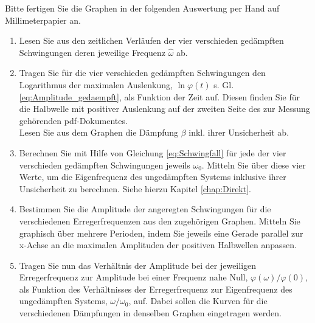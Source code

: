 \begin{hint}
	Bitte fertigen Sie die Graphen in der folgenden Auswertung per Hand auf Millimeterpapier an.
\end{hint}

\begin{enumerate}
	\item \label{aw:Schwingfall} Lesen Sie aus den zeitlichen Verläufen der vier verschieden gedämpften Schwingungen deren jeweilige Frequenz $\hat{\omega}$ ab.
	\item \label{aw:Log_Dekrement}Tragen Sie für die vier verschieden gedämpften Schwingungen den Logarithmus der maximalen Auslenkung, $\ln\varphi(t)$ s. Gl. \ref{eq:Amplitude_gedaempft}, als Funktion der Zeit auf. Diesen finden Sie für die Halbwelle mit positiver Auslenkung auf der zweiten Seite des zur Messung gehörenden pdf-Dokumentes. \\
	Lesen Sie aus dem Graphen die Dämpfung $\beta$ inkl. ihrer Unsicherheit ab.
	\item Berechnen Sie mit Hilfe von Gleichung \ref{eq:Schwingfall} für jede der vier verschieden gedämpften Schwingungen jeweils $\omega_0$. Mitteln Sie über diese vier Werte, um die Eigenfrequenz des ungedämpften Systems inklusive ihrer Unsicherheit zu berechnen. Siehe hierzu Kapitel \ref{chap:Direkt}.
	\item Bestimmen Sie die Amplitude der angeregten Schwingungen für die verschiedenen Erregerfrequenzen aus den zugehörigen Graphen. Mitteln Sie graphisch über mehrere Perioden, indem Sie jeweils eine Gerade parallel zur x-Achse  an die maximalen Amplituden der positiven Halbwellen anpassen. 
	\item Tragen Sie nun das Verhältnis der Amplitude bei der jeweiligen Erregerfrequenz zur Amplitude bei einer Frequenz nahe Null, $\varphi(\omega)/\varphi(0)$, als Funktion des Verhältnisses der Erregerfrequenz zur Eigenfrequenz des ungedämpften Systems, $\omega/\omega_0$, auf. Dabei sollen die Kurven für die verschiedenen Dämpfungen in denselben Graphen eingetragen werden.
\end{enumerate}